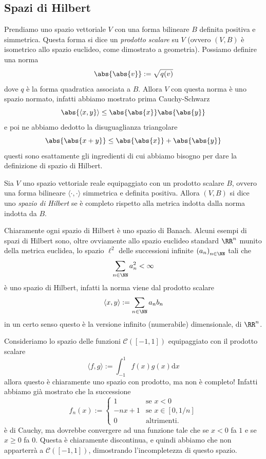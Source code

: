 \documentclass[11pt]{scrartcl}
\newcommand{\dif}{\text{d}}
\begin{document}
	\subsection{Spazi di Hilbert}
	Prendiamo uno spazio vettoriale $V$ con una forma bilineare $B$ definita positiva e simmetrica. Questa forma si dice un \textit{prodotto scalare} su $V$ (ovvero $(V,B)$ è isometrico allo spazio euclideo, come dimostrato a geometria). Possiamo definire una norma 
	$$\abs{\abs{v}}:=\sqrt{q(v)}$$
	dove $q$ è la forma quadratica associata a $B$. Allora $V$ con questa norma è uno spazio normato, infatti abbiamo mostrato prima Cauchy-Schwarz
	$$\abs{\langle x,y}\rangle \le \abs{\abs{x}}\abs{\abs{y}}$$
	e poi ne abbiamo dedotto la disuguaglianza triangolare
	$$\abs{\abs{x+y}}\le \abs{\abs{x}}+\abs{\abs{y}}$$
	questi sono esattamente gli ingredienti di cui abbiamo bisogno per dare la definizione di spazio di Hilbert.
	\begin{definition}
		Sia $V$ uno spazio vettoriale reale equipaggiato con un prodotto scalare $B$, ovvero una forma bilineare $\langle \cdot,\cdot\rangle$ simmetrica e definita positiva. Allora $(V,B)$ si dice uno \textit{spazio di Hilbert} se è completo rispetto alla metrica indotta dalla norma indotta da $B$.
	\end{definition}
	Chiaramente ogni spazio di Hilbert è uno spazio di Banach. Alcuni esempi di spazi di Hilbert sono, oltre ovviamente allo spazio euclideo standard $\RR^n$ munito della metrica euclidea, lo spazio $\ell^2$ delle successioni infinite $\left(a_n\right)_{n\in\NN}$ tali che
	$$\sum_{n\in\NN}a_n^2<\infty$$
	è uno spazio di Hilbert, infatti la norma viene dal prodotto scalare 
	$$\langle x,y\rangle:=\sum_{n\in\NN}a_nb_n$$
	in un certo senso questo è la versione infinito (numerabile) dimensionale, di $\RR^n$. 
	\begin{example}
		Consideriamo lo spazio delle funzioni $\mathcal{C}([-1,1])$ equipaggiato con il prodotto scalare
		$$\langle f,g\rangle:=\int_{-1}^1 f(x)g(x)\dif x$$
		allora questo è chiaramente uno spazio con prodotto, ma non è completo! Infatti abbiamo già mostrato che la successione
		$$f_n(x):=
		\begin{cases}
			1 & \text{se $x<0$} \\
			-nx+1 & \text{se $x\in [0,1/n]$} \\
			0 & \text{altrimenti.}
		\end{cases}
		$$
		è di Cauchy, ma dovrebbe convergere ad una funzione tale che se $x<0$ fa $1$ e se $x\ge 0$ fa $0$. Questa è chiaramente discontinua, e quindi abbiamo che non apparterrà a $\mathcal{C}([-1,1])$, dimostrando l'incompletezza di questo spazio.
	\end{example}
\end{document}
